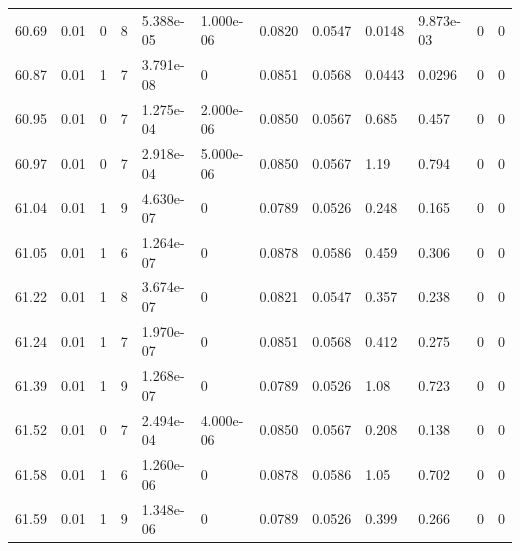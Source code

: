 \documentclass[preview]{standalone}
\begin{document}
{{{{{{{{{{{{{{{{\begin{tabular}{L{1.2cm}C{1.2cm} C{0.3cm}C{0.5cm} C{1.4cm}C{1.4cm} C{1.4cm}C{1.4cm} C{1.6cm}C{1.6cm} C{1.6cm}C{1.6cm}}
  60.69  &  0.01  & 0     &  8 &  5.388e-05  & 1.000e-06  &  0.0820&   0.0547& 0.0148 & 9.873e-03   &  0 & 0  \\ 
  60.87  &  0.01  & 1     &  7 &  3.791e-08  & 0  &  0.0851&   0.0568& 0.0443 & 0.0296   &  0 & 0  \\ 
  60.95  &  0.01  & 0     &  7 &  1.275e-04  & 2.000e-06  &  0.0850&   0.0567& 0.685 & 0.457   &  0 & 0  \\ 
  60.97  &  0.01  & 0     &  7 &  2.918e-04  & 5.000e-06  &  0.0850&   0.0567& 1.19 & 0.794   &  0 & 0  \\ 
  61.04  &  0.01  & 1     &  9 &  4.630e-07  & 0  &  0.0789&   0.0526& 0.248 & 0.165   &  0 & 0  \\ 
  61.05  &  0.01  & 1     &  6 &  1.264e-07  & 0  &  0.0878&   0.0586& 0.459 & 0.306   &  0 & 0  \\ 
  61.22  &  0.01  & 1     &  8 &  3.674e-07  & 0  &  0.0821&   0.0547& 0.357 & 0.238   &  0 & 0  \\ 
  61.24  &  0.01  & 1     &  7 &  1.970e-07  & 0  &  0.0851&   0.0568& 0.412 & 0.275   &  0 & 0  \\ 
  61.39  &  0.01  & 1     &  9 &  1.268e-07  & 0  &  0.0789&   0.0526& 1.08 & 0.723   &  0 & 0  \\ 
  61.52  &  0.01  & 0     &  7 &  2.494e-04  & 4.000e-06  &  0.0850&   0.0567& 0.208 & 0.138   &  0 & 0  \\ 
  61.58  &  0.01  & 1     &  6 &  1.260e-06  & 0  &  0.0878&   0.0586& 1.05 & 0.702   &  0 & 0  \\ 
  61.59  &  0.01  & 1     &  9 &  1.348e-06  & 0  &  0.0789&   0.0526& 0.399 & 0.266   &  0 & 0  \\ 
\hline 
\end{tabular} 

}}}}}}}}}}}}}}}}
\end{document}
